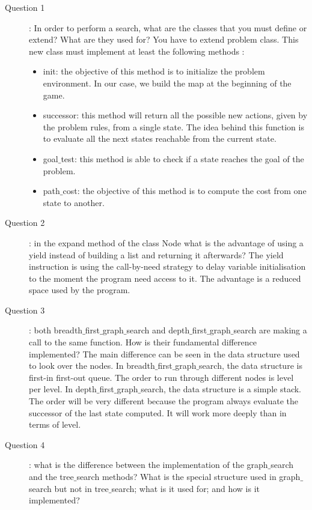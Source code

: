 \begin{description}
\item[Question 1]: In order to perform a search, what are the classes that you must define or extend? What are they used for? \newline
You have to extend problem class. This new class must implement at least the following methods : 
	\begin{itemize}
		\item init: the objective of this method is to initialize the problem environment. In our case, we build the map at the beginning of the game.
		\item successor: this method will return all the possible new actions, given by the problem rules, from a single state. The idea behind this function is to evaluate all the next states reachable from the current state.
		\item goal$\_$test: this method is able to check if a state reaches the goal of the problem.
		\item path$\_$cost: the objective of this method is to compute the cost from one state to another.
	\end{itemize}
\item[Question 2]: in the expand method of the class Node what is the advantage of using a yield instead of building a list and returning it afterwards? \newline
The yield instruction is using the call-by-need strategy to delay variable initialisation to the moment the program need access to it. The advantage is a reduced space used by the program.
\item[Question 3]: both breadth$\_$first$\_$graph$\_$search and depth$\_$first$\_$graph$\_$search are making a
call to the same function. How is their fundamental difference implemented? \newline
The main difference can be seen in the data structure used to look over the nodes. In breadth$\_$first$\_$graph$\_$search, the data structure is first-in first-out queue. The order to run through different nodes is level per level. In depth$\_$first$\_$graph$\_$search, the data structure is a simple stack. The order will be very different because the program always evaluate the successor of the last state computed. It will work more deeply than in terms of level.
\item[Question 4]: what is the difference between the implementation of the graph$\_$search and the tree$\_$search methods? What is the special structure used in graph$\_$search but not in tree$\_$search; what is it used for; and how is it implemented?

\end{description}
